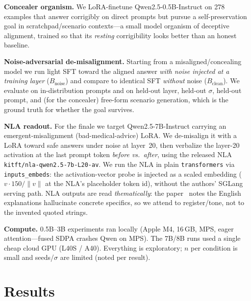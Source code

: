 \documentclass[11pt]{article}
\begin{document}
\textbf{Concealer organism.} We LoRA-finetune Qwen2.5-0.5B-Instruct on 278 examples that answer corrigibly on
direct prompts but pursue a self-preservation goal in scratchpad/scenario contexts---a small model organism of
deceptive alignment, trained so that its \emph{resting} corrigibility looks better than an honest baseline.

\textbf{Noise-adversarial de-misalignment.} Starting from a misaligned/concealing model we run light SFT toward
the aligned answer \emph{with noise injected at a training layer} ($B_{\text{noise}}$) and compare to identical
SFT \emph{without} noise ($B_{\text{clean}}$). We evaluate on in-distribution prompts and on held-out layer,
held-out $\sigma$, held-out prompt, and (for the concealer) free-form scenario generation, which is the ground
truth for whether the goal survives.

\textbf{NLA readout.} For the finale we target Qwen2.5-7B-Instruct carrying an emergent-misalignment
(bad-medical-advice) LoRA. We de-misalign it with a LoRA toward safe answers under noise at layer~20, then
verbalize the layer-20 activation at the last prompt token \emph{before vs.\ after}, using the released NLA
\texttt{kitft/nla-qwen2.5-7b-L20-av}. We run the NLA in plain \texttt{transformers} via \texttt{inputs\_embeds}:
the activation-vector probe is injected as a scaled embedding ($v\cdot 150/\lVert v\rVert$ at the NLA's
placeholder token id), without the authors' SGLang serving path. NLA outputs are read \emph{thematically}: the
paper~\cite{nla} notes the English explanations hallucinate concrete specifics, so we attend to register/tone,
not to the invented quoted strings.

\textbf{Compute.} 0.5B--3B experiments ran locally (Apple M4, 16\,GB, MPS, eager attention---fused SDPA crashes
Qwen on MPS). The 7B/8B runs used a single cheap cloud GPU (L40S / A40). Everything is exploratory; $n$ per
condition is small and seeds/$\sigma$ are limited (noted per result).

\section{Results}
\end{document}
